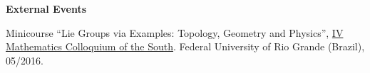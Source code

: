 \documentclass[10pt]{article}
\renewcommand{\section}[2]%
{\pagebreak[2]\vspace{1.3\baselineskip}%
	\phantomsection\addcontentsline{toc}{section}{#1}%
	\hspace{0in}%
	\marginpar{
		\raggedright \scshape #1}#2}
\newenvironment{outerlist}[1][\enskip\textbullet]%
{\begin{itemize}[#1]}{\end{itemize}%
	\vspace{-.6\baselineskip}}
\newenvironment{innerlist}[1][\enskip\textbullet]%
{\begin{compactitem}[#1]}{\end{compactitem}}
\begin{document}
\begin{outerlist}
\begin{innerlist}[-]
		\end{innerlist}
		
		\item \textbf{External Events}
		
		\begin{innerlist}[-]
			\item Minicourse ``Lie Groups via Examples: Topology, Geometry and Physics'', \href{https://sbm.org.br/coloquios-de-matematica-das-regioes/}{IV Mathematics Colloquium of the South}. Federal University of Rio Grande (Brazil), 05/2016.
		\end{innerlist}
	\end{outerlist}
	
	
%	
%	
%	
%	
%	
%	
	
	
	
	
	
	
	
		
		
	
		
		
		
		
		

	
	
\end{document}
